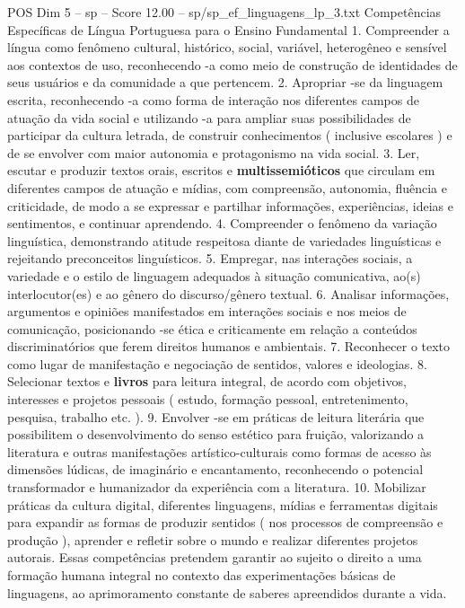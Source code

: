 \begin{textsample}{POS Dim 5 – sp – Score 12.00 – sp/sp\_ef\_linguagens\_lp\_3.txt}  \label{ex:f5_pos_071}
Competências Específicas de Língua Portuguesa para o Ensino Fundamental 1.
Compreender a língua como fenômeno cultural, histórico, social, variável, heterogêneo e sensível aos contextos de uso, reconhecendo -a como meio de construção de identidades de seus usuários e da comunidade a que pertencem. 2.
Apropriar -se da linguagem escrita, reconhecendo -a como forma de interação nos diferentes campos de atuação da vida social e utilizando -a para ampliar suas possibilidades de participar da cultura letrada, de construir conhecimentos ( inclusive escolares ) e de se envolver com maior autonomia e protagonismo na vida social. 3.
Ler, escutar e produzir textos orais, escritos e \textbf{multissemióticos} que circulam em diferentes campos de atuação e mídias, com compreensão, autonomia, fluência e criticidade, de modo a se expressar e partilhar informações, experiências, ideias e sentimentos, e continuar aprendendo. 4.
Compreender o fenômeno da variação linguística, demonstrando atitude respeitosa diante de variedades linguísticas e rejeitando preconceitos linguísticos. 5.
Empregar, nas interações sociais, a variedade e o estilo de linguagem adequados à situação comunicativa, ao(s) interlocutor(es) e ao gênero do discurso/gênero textual. 6.
Analisar informações, argumentos e opiniões manifestados em interações sociais e nos meios de comunicação, posicionando -se ética e criticamente em relação a conteúdos discriminatórios que ferem direitos humanos e ambientais. 7.
Reconhecer o texto como lugar de manifestação e negociação de sentidos, valores e ideologias. 8.
Selecionar textos e \textbf{livros} para leitura integral, de acordo com objetivos, interesses e projetos pessoais ( estudo, formação pessoal, entretenimento, pesquisa, trabalho etc. ). 9.
Envolver -se em práticas de leitura literária que possibilitem o desenvolvimento do senso estético para fruição, valorizando a literatura e outras manifestações artístico-culturais como formas de acesso às dimensões lúdicas, de imaginário e encantamento, reconhecendo o potencial transformador e humanizador da experiência com a literatura. 10.
Mobilizar práticas da cultura digital, diferentes linguagens, mídias e ferramentas digitais para expandir as formas de produzir sentidos ( nos processos de compreensão e produção ), aprender e refletir sobre o mundo e realizar diferentes projetos autorais.
Essas competências pretendem garantir ao sujeito o direito a uma formação humana integral no contexto das experimentações básicas de linguagens, ao aprimoramento constante de saberes apreendidos durante a vida.

\end{textsample}
